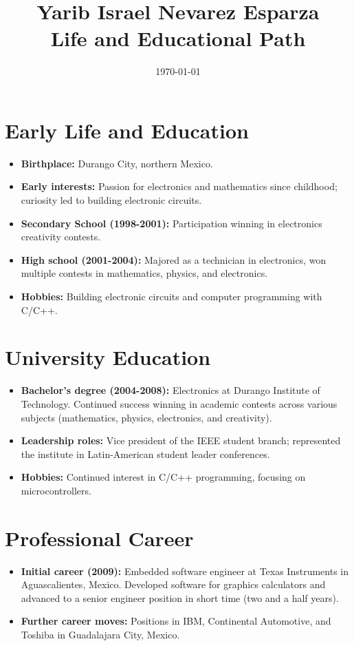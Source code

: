 \documentclass{article}
\title{Yarib Israel Nevarez Esparza \\ Life and Educational Path}
\author{}
\date{\today}
\begin{document}
\maketitle

\section*{Early Life and Education}
\begin{itemize}[noitemsep]
    \item \textbf{Birthplace:} Durango City, northern Mexico.
    \item \textbf{Early interests:} Passion for electronics and mathematics since childhood; curiosity led to building electronic circuits.
    \item \textbf{Secondary School (1998-2001):} Participation winning in electronics creativity contests.
    \item \textbf{High school (2001-2004):} Majored as a technician in electronics, won multiple contests in mathematics, physics, and electronics.
    \item \textbf{Hobbies:} Building electronic circuits and computer programming with C/C++.
\end{itemize}

\section*{University Education}
\begin{itemize}[noitemsep]
    \item \textbf{Bachelor's degree (2004-2008):} Electronics at Durango Institute of Technology. Continued success winning in academic contests across various subjects (mathematics, physics, electronics, and creativity). 
    \item \textbf{Leadership roles:} Vice president of the IEEE student branch; represented the institute in Latin-American student leader conferences.
    \item \textbf{Hobbies:} Continued interest in C/C++ programming, focusing on microcontrollers.
\end{itemize}

\section*{Professional Career}
\begin{itemize}[noitemsep]
    \item \textbf{Initial career (2009):} Embedded software engineer at Texas Instruments in Aguascalientes, Mexico. Developed software for graphics calculators and advanced to a senior engineer position in short time (two and a half years).
    \item \textbf{Further career moves:} Positions in IBM, Continental Automotive, and Toshiba in Guadalajara City, Mexico.
\end{itemize}
\end{document}
